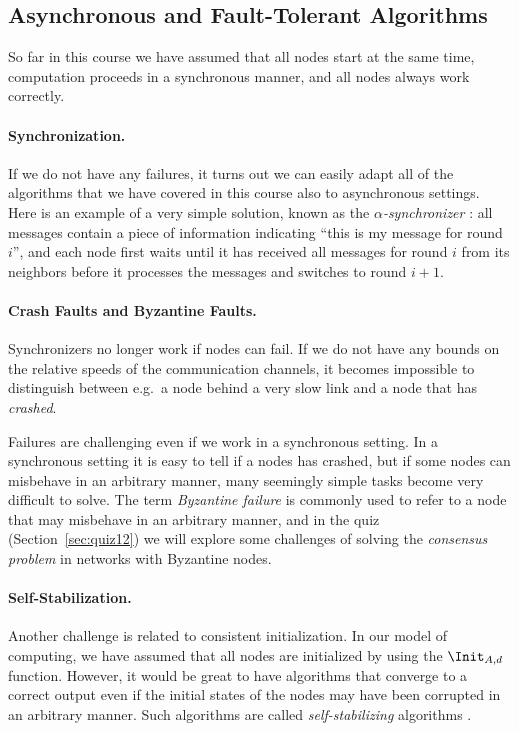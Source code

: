 \subsection{Asynchronous and Fault-Tolerant Algorithms}

So far in this course we have assumed that all nodes start at the same time, computation proceeds in a synchronous manner, and all nodes always work correctly.

\paragraph{Synchronization.}

If we do not have any failures, it turns out we can easily adapt all of the algorithms that we have covered in this course also to asynchronous settings. Here is an example of a very simple solution, known as the \emph{$\alpha$-synchronizer} \cite{Awerbuch1985}: all messages contain a piece of information indicating ``this is my message for round $i$'', and each node first waits until it has received all messages for round $i$ from its neighbors before it processes the messages and switches to round $i+1$.

\paragraph{Crash Faults and Byzantine Faults.}

Synchronizers no longer work if nodes can fail. If we do not have any bounds on the relative speeds of the communication channels, it becomes impossible to distinguish between e.g.\ a node behind a very slow link and a node that has \emph{crashed}.

Failures are challenging even if we work in a synchronous setting. In a synchronous setting it is easy to tell if a nodes has crashed, but if some nodes can misbehave in an arbitrary manner, many seemingly simple tasks become very difficult to solve. The term \emph{Byzantine failure} is commonly used to refer to a node that may misbehave in an arbitrary manner, and in the quiz (Section~\ref{sec:quiz12}) we will explore some challenges of solving the \emph{consensus problem} in networks with Byzantine nodes.

\paragraph{Self-Stabilization.}

Another challenge is related to consistent initialization. In our model of computing, we have assumed that all nodes are initialized by using the $\Init_{A,d}$ function. However, it would be great to have algorithms that converge to a correct output even if the initial states of the nodes may have been corrupted in an arbitrary manner. Such algorithms are called \emph{self-stabilizing} algorithms \cite{Dolev2000}.

